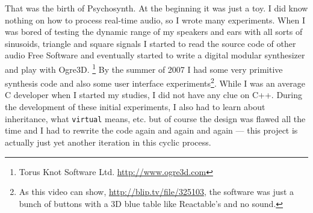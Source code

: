 That was the birth of Psychosynth. At the beginning it was just a
toy. I did know nothing on how to process real-time audio, so I wrote
many experiments. When I was bored of testing the dynamic range of my
speakers and ears with all sorts of sinusoids, triangle and square
signals I started to read the source code of other audio Free Software
and eventually started to write a digital modular synthesizer and play
with Ogre3D. %
\footnote{Torus Knot Software Ltd. \url{http://www.ogre3d.com}} By the
summer of 2007 I had some very primitive synthesis code and also some
user interface experiments\footnote{As this video can show,
  \url{http://blip.tv/file/325103}, the software was just a bunch of
  buttons with a 3D blue table like Reactable's and no sound.}. While
I was an average C developer when I started my studies, I did not have
any clue on C++. During the development of these initial experiments,
I also had to learn about inheritance, what \texttt{virtual} means,
etc. but of course the design was flawed all the time and I had to
rewrite the code again and again and again --- this project is
actually just yet another iteration in this cyclic process.

